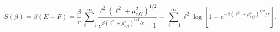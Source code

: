 \begin{equation}
S\left(\beta \right)=\beta \left(E-F\right)=\frac{\beta }{r}\sum _{\ell =1}^{\infty }\frac{\ell ^{2}\left(\ell ^{2}+\mu _{eff}^{2}\right)^{1/2}}{e^{\beta \left(\ell ^{2}+\mu _{eff}^{2}\right)^{1/2}/r}-1}-\sum _{\ell =1}^{\infty }\ell ^{2}\log \left[1-e^{-\beta \left(\ell ^{2}+\mu _{eff}^{2}\right)^{1/2}/r}\right].\end{equation}

